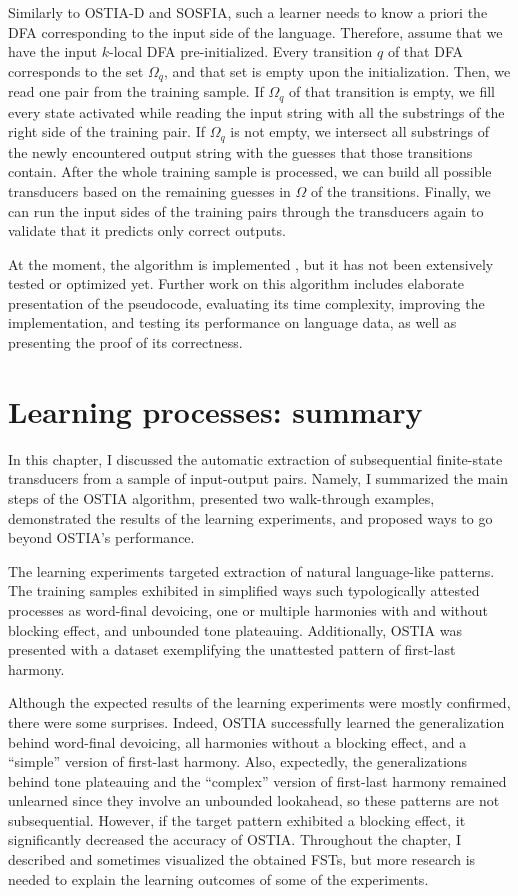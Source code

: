 Similarly to OSTIA-D and SOSFIA, such a learner needs to know a priori the DFA corresponding to the input side of the language.
Therefore, assume that we have the input $k$-local DFA pre-initialized.
Every transition $q$ of that DFA corresponds to the set $\Omega_q$, and that set is empty upon the initialization.
Then, we read one pair from the training sample.
If $\Omega_q$ of that transition is empty, we fill every state activated while reading the input string with all the substrings of the right side of the training pair.
If $\Omega_q$ is not empty, we intersect all substrings of the newly encountered output string with the guesses that those transitions contain.
After the whole training sample is processed, we can build all possible transducers based on the remaining guesses in $\Omega$ of the transitions.
Finally, we can run the input sides of the training pairs through the transducers again to validate that it predicts only correct outputs.

At the moment, the algorithm is implemented \href{https://github.com/alenaks/subregular-experiments/blob/master/ISL_group_learner.ipynb}{\faGithub} \citep{GHbrutefst}, but it has not been extensively tested or optimized yet.
Further work on this algorithm includes elaborate presentation of the pseudocode, evaluating its time complexity, improving the implementation, and testing its performance on language data, as well as presenting the proof of its correctness.


\section{Learning processes: summary}

In this chapter, I discussed the automatic extraction of subsequential finite-state transducers from a sample of input-output pairs.
Namely, I summarized the main steps of the OSTIA algorithm, presented two walk-through examples, demonstrated the results of the learning experiments, and proposed ways to go beyond OSTIA's performance.

The learning experiments targeted extraction of natural language-like patterns.
The training samples exhibited in simplified ways such typologically attested processes as word-final devoicing, one or multiple harmonies with and without blocking effect, and unbounded tone plateauing.
Additionally, OSTIA was presented with a dataset exemplifying the unattested pattern of first-last harmony.


Although the expected results of the learning experiments were mostly confirmed, there were some surprises.
Indeed, OSTIA successfully learned the generalization behind word-final devoicing, all harmonies without a blocking effect, and a ``simple'' version of first-last harmony.
Also, expectedly, the generalizations behind tone plateauing and the ``complex'' version of first-last harmony remained unlearned since they involve an unbounded lookahead, so these patterns are not subsequential.
However, if the target pattern exhibited a blocking effect, it significantly decreased the accuracy of OSTIA.
Throughout the chapter, I described and sometimes visualized the obtained FSTs, but more research is needed to explain the learning outcomes of some of the experiments.


